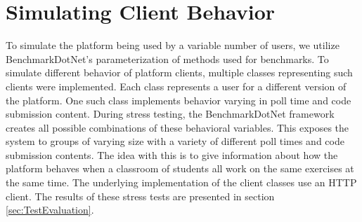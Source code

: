 
\section{Simulating Client Behavior}
To simulate the platform being used by a variable number of users, we utilize BenchmarkDotNet's parameterization of methods used for benchmarks.
To simulate different behavior of platform clients, multiple classes representing such clients were implemented.
Each class represents a user for a different version of the platform.
One such class implements behavior varying in poll time and code submission content.
During stress testing, the BenchmarkDotNet framework creates all possible combinations of these behavioral variables.
This exposes the system to groups of varying size with a variety of different poll times and code submission contents.
The idea with this is to give information about how the platform behaves when a classroom of students all work on the same exercises at the same time.
The underlying implementation of the client classes use an HTTP client.
The results of these stress tests are presented in section \ref{sec:TestEvaluation}. 